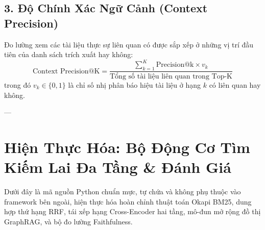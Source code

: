 \subsection{3. Độ Chính Xác Ngữ Cảnh (Context Precision)}
Đo lường xem các tài liệu thực sự liên quan có được sắp xếp ở những vị trí đầu tiên của danh sách trích xuất hay không:
\begin{equation}
\text{Context Precision@K} = \frac{\sum_{k=1}^K \text{Precision@k} \times v_k}{\text{Tổng số tài liệu liên quan trong Top-K}}
\end{equation}
trong đó $v_k \in \{0, 1\}$ là chỉ số nhị phân báo hiệu tài liệu ở hạng $k$ có liên quan hay không.

---

\section{Hiện Thực Hóa: Bộ Động Cơ Tìm Kiếm Lai Đa Tầng \& Đánh Giá}
\label{sec:python-hybrid-engine}

Dưới đây là mã nguồn Python chuẩn mực, tự chứa và không phụ thuộc vào framework bên ngoài, hiện thực hóa hoàn chỉnh thuật toán Okapi BM25, dung hợp thứ hạng RRF, tái xếp hạng Cross-Encoder hai tầng, mô-đun mở rộng đồ thị GraphRAG, và bộ đo lường Faithfulness.

